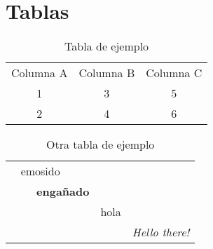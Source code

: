 \section{Tablas}

\begin{table}[ht]
  \begin{tabular}{ |c|c|c| } 
    \hline
    Columna A & Columna B & Columna C\\ 
    1 & 3 & 5 \\ 
    2 & 4 & 6 \\ 
    \hline
  \end{tabular}
  \centering
  \caption{Tabla de ejemplo}
  \label{tab:tabla1}
\end{table}

\vspace{1cm}

\begin{table}[ht]
\begin{tabular}{ccccc}
\cline{1-4}
\multicolumn{2}{|c|}{emosido}                       & \multicolumn{1}{c|}{}      & \multicolumn{1}{c|}{}     &                       \\ \cline{1-4}
\multicolumn{1}{|c|}{} & \multicolumn{2}{c|}{\multirow{2}{*}{\textbf{engañado}}} & \multicolumn{1}{c|}{}     &                       \\ \cline{1-1} \cline{4-4}
\multicolumn{1}{|c|}{} & \multicolumn{2}{c|}{}                                   & \multicolumn{1}{c|}{}     &                       \\ \cline{1-4}
\multicolumn{1}{|c|}{} & \multicolumn{1}{c|}{}      & \multicolumn{1}{c|}{}      & \multicolumn{1}{c|}{hola} &                       \\ \cline{1-4}
                       &                            &                            &                           & \textit{Hello there!}
\end{tabular}
\centering
\caption{Otra tabla de ejemplo}
\label{tab:tablaEmosido}
\end{table}